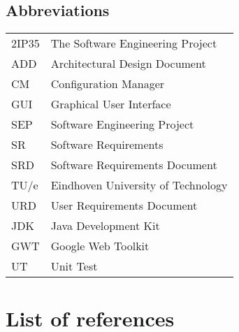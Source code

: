 \subsection{Abbreviations}
\begin{tabular}{l|l}
2IP35 & The Software Engineering Project \\
ADD & Architectural Design Document \\
CM    & Configuration Manager \\
GUI & Graphical User Interface \\
SEP   & Software Engineering Project \\
SR    & Software Requirements \\
SRD   & Software Requirements Document \\
TU/e  & Eindhoven University of Technology \\
URD   & User Requirements Document \\
JDK   & Java Development Kit \\
GWT   & Google Web Toolkit \\
UT    & Unit Test
\end{tabular}

\section{List of references}

